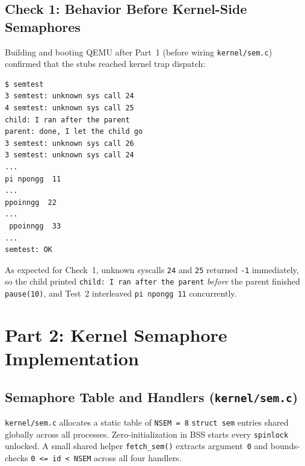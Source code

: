 \documentclass[12pt,a4paper]{article}
\begin{document}
\newpage
\subsection{Check 1: Behavior Before Kernel-Side Semaphores}
Building and booting QEMU after Part~1 (before wiring \texttt{kernel/\allowbreak sem.c}) confirmed that the stubs reached kernel trap dispatch:
\begin{lstlisting}[style=consolestyle, caption={Observed Check 1 output before implementing kernel semaphores}]
$ semtest
3 semtest: unknown sys call 24
4 semtest: unknown sys call 25
child: I ran after the parent
parent: done, I let the child go
3 semtest: unknown sys call 26
3 semtest: unknown sys call 24
...
pi npongg  11
...
ppoinngg  22
...
 ppoinngg  33
...
semtest: OK
\end{lstlisting}
As expected for Check~1, unknown syscalls \texttt{24} and \texttt{25} returned \texttt{-1} immediately, so the child printed \texttt{child: I ran after the parent} \emph{before} the parent finished \texttt{pause(10)}, and Test~2 interleaved \texttt{pi npongg 11} concurrently.

\newpage
\section{Part 2: Kernel Semaphore Implementation}

\subsection{Semaphore Table and Handlers (\texttt{kernel/sem.c})}
\texttt{kernel/\allowbreak sem.c} allocates a static table of \texttt{NSEM = 8} \texttt{struct sem} entries shared globally across all processes. Zero-initialization in BSS starts every \texttt{spinlock} unlocked. A small shared helper \texttt{fetch\_\allowbreak sem()} extracts argument~\texttt{0} and bounds-checks \texttt{0 <= id < NSEM} across all four handlers.


\end{document}

